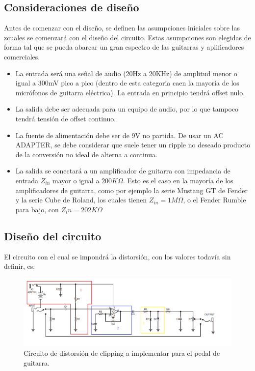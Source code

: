 \documentclass[../../main.tex]{subfiles}
\begin{document}
\subsection{Consideraciones de dise\~no} \label{ssec:ej5_consideraciones_disenio}
Antes de comenzar con el diseño, se definen las asumpciones iniciales sobre las zcuales se comenzará con el diseño del circuito. Estas asumpciones son elegidas de forma tal que se pueda abarcar un gran espectro de las guitarras y aplificadores comerciales.\par
\begin{itemize}
	\item La entrada ser\'a una señal de audio (20Hz a 20KHz) de amplitud menor o igual a 300mV pico a pico (dentro de esta categoria caen la mayor\'ia de los micr\'ofonos de guitarra el\'ectrica). La entrada en principio tendrá offset nulo.
	\item La salida debe ser adecuada para un equipo de audio, por lo que tampoco tendrá tensión de offset continuo.
	\item La fuente de alimentaci\'on debe ser de 9V no partida. De usar un AC ADAPTER, se debe considerar que suele tener un ripple no deseado producto de la conversi\'on no ideal de alterna a continua.
	\item La salida se conectar\'a a un amplificador de guitarra con impedancia de entrada $Z_{in}$ mayor o igual a $200K\Omega$. Esto es el caso en la mayor\'ia de los amplificadores de guitarra, como por ejemplo la serie Mustang GT de Fender y la serie Cube de Roland, los cuales tienen $Z_{in} = 1M\Omega$, o el Fender Rumble para bajo, con $Z_in = 202K\Omega$ 

\end{itemize}


\subsection{Dise\~no del circuito}
\label{disenoCirc}
El circuito con el cual se impondrá la distorsión, con los valores todavía sin definir, es:

\begin{figure}[H]	%
	\centering
	\includegraphics[scale=0.6]{imagenes/Circuito_consigna.png}
	\caption{Circuito de distorsión de clipping a implementar para el pedal de guitarra.}
	\label{fig:ej5_Circuito_consigna}
\end{figure}
\end{document}
